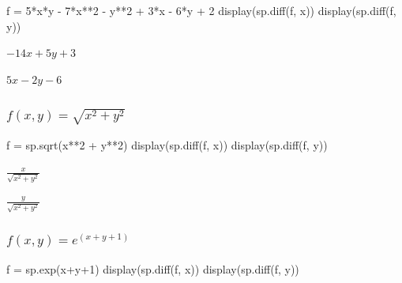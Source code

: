\documentclass[
  letterpaper,
  DIV=11,
  numbers=noendperiod]{scrartcl}
\newenvironment{Shaded}{\begin{snugshade}}{\end{snugshade}}
\newcommand{\DecValTok}[1]{\textcolor[rgb]{0.68,0.00,0.00}{#1}}
\newcommand{\NormalTok}[1]{\textcolor[rgb]{0.00,0.23,0.31}{#1}}
\newcommand{\OperatorTok}[1]{\textcolor[rgb]{0.37,0.37,0.37}{#1}}
\begin{document}
\begin{Shaded}
\begin{Highlighting}[numbers=left,,]
\NormalTok{f }\OperatorTok{=} \DecValTok{5}\OperatorTok{*}\NormalTok{x}\OperatorTok{*}\NormalTok{y }\OperatorTok{{-}} \DecValTok{7}\OperatorTok{*}\NormalTok{x}\OperatorTok{**}\DecValTok{2} \OperatorTok{{-}}\NormalTok{ y}\OperatorTok{**}\DecValTok{2} \OperatorTok{+} \DecValTok{3}\OperatorTok{*}\NormalTok{x }\OperatorTok{{-}} \DecValTok{6}\OperatorTok{*}\NormalTok{y }\OperatorTok{+} \DecValTok{2}
\NormalTok{display(sp.diff(f, x))}
\NormalTok{display(sp.diff(f, y))}
\end{Highlighting}
\end{Shaded}

$\displaystyle - 14 x + 5 y + 3$

$\displaystyle 5 x - 2 y - 6$

\hypertarget{fx-y-sqrtx2y2}{%
\subsubsection{\texorpdfstring{\(f(x, y) = \sqrt{x^2+y^2}\)}{f(x, y) = \textbackslash sqrt\{x\^{}2+y\^{}2\}}}\label{fx-y-sqrtx2y2}}

\begin{Shaded}
\begin{Highlighting}[numbers=left,,]
\NormalTok{f }\OperatorTok{=}\NormalTok{ sp.sqrt(x}\OperatorTok{**}\DecValTok{2} \OperatorTok{+}\NormalTok{ y}\OperatorTok{**}\DecValTok{2}\NormalTok{)}
\NormalTok{display(sp.diff(f, x))}
\NormalTok{display(sp.diff(f, y))}
\end{Highlighting}
\end{Shaded}

$\displaystyle \frac{x}{\sqrt{x^{2} + y^{2}}}$

$\displaystyle \frac{y}{\sqrt{x^{2} + y^{2}}}$

\hypertarget{fx-y-exy1}{%
\subsubsection{\texorpdfstring{\(f(x, y) = e^{(x+y+1)}\)}{f(x, y) = e\^{}\{(x+y+1)\}}}\label{fx-y-exy1}}

\begin{Shaded}
\begin{Highlighting}[numbers=left,,]
\NormalTok{f }\OperatorTok{=}\NormalTok{ sp.exp(x}\OperatorTok{+}\NormalTok{y}\OperatorTok{+}\DecValTok{1}\NormalTok{) }
\NormalTok{display(sp.diff(f, x))}
\NormalTok{display(sp.diff(f, y))}
\end{Highlighting}
\end{Shaded}
\end{document}
